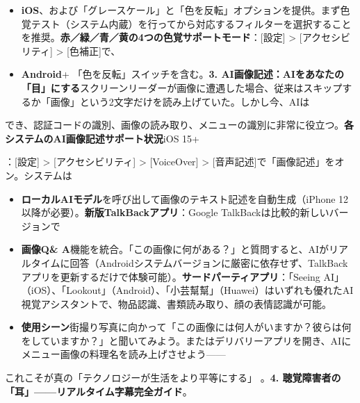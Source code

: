 
\begin{itemize}
  \item \textbf{iOS}、および「グレースケール」と「色を反転」オプションを提供。まず色覚テスト（システム内蔵）を行ってから対応するフィルターを選択することを推奨。\textbf{赤／緑／青／黄の4つの色覚サポートモード}：[設定] > [アクセシビリティ] > [色補正]で、
  \item \textbf{Android}+ 「色を反転」スイッチを含む。\textbf{3. AI画像記述：AIをあなたの「目」にする}スクリーンリーダーが画像に遭遇した場合、従来はスキップするか「画像」という2文字だけを読み上げていた。しかし今、AIは
\end{itemize}


でき、認証コードの識別、画像の読み取り、メニューの識別に非常に役立つ。\textbf{各システムのAI画像記述サポート状況}iOS 15+

\begin{tcbinfo}{：[設定] > [アクセシビリティ] > [VoiceOver] > [音声記述]で「画像記述」をオン。システムは}
\begin{itemize}
  \item \textbf{ローカルAIモデル}を呼び出して画像のテキスト記述を自動生成（iPhone 12以降が必要）。\textbf{新版TalkBackアプリ}：Google TalkBackは比較的新しいバージョンで
  \item \textbf{画像Q\& A}機能を統合。「この画像に何がある？」と質問すると、AIがリアルタイムに回答（Androidシステムバージョンに厳密に依存せず、TalkBackアプリを更新するだけで体験可能）。\textbf{サードパーティアプリ}：「Seeing AI」（iOS）、「Lookout」（Android）、「小芸幫幫」（Huawei）はいずれも優れたAI視覚アシスタントで、物品認識、書類読み取り、顔の表情認識が可能。
  \item \textbf{使用シーン}街撮り写真に向かって「この画像には何人がいますか？彼らは何をしていますか？」と聞いてみよう。またはデリバリーアプリを開き、AIにメニュー画像の料理名を読み上げさせよう——
\end{itemize}

\end{tcbinfo}

\begin{tcbpractice}{これこそが真の「テクノロジーが生活をより平等にする」}
。\textbf{4. 聴覚障害者の「耳」——リアルタイム字幕完全ガイド}。

\end{tcbpractice}

